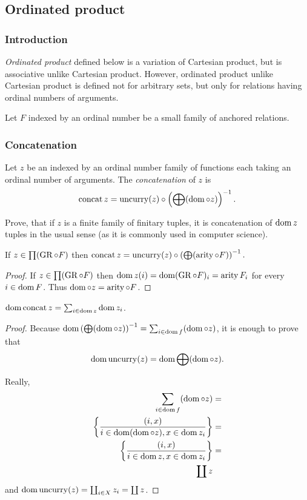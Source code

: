 \subsection{\label{ordinated-prod}Ordinated product}


\subsubsection{Introduction}

\emph{Ordinated product} defined below is a variation of Cartesian
product, but is associative unlike Cartesian product. However, ordinated
product unlike Cartesian product is defined not for arbitrary sets,
but only for relations having ordinal numbers of arguments.

Let $F$ indexed by an ordinal number be a small family of anchored
relations.


\subsubsection{Concatenation}
\begin{defn}
Let $z$ be an indexed by an ordinal number
family of functions each taking an ordinal number of arguments. The
\emph{concatenation} of $z$ is
\[
\operatorname{concat} z=\operatorname{uncurry}(z)\circ\left(\bigoplus(\operatorname{dom}\circ z)\right)^{-1}.
\]
\end{defn}
\begin{xca}
Prove, that if $z$ is a finite family of finitary tuples, it is concatenation
of $\operatorname{dom} z$ tuples in the usual sense (as it is commonly used in
computer science).\end{xca}
\begin{prop}
If $z\in\prod(\operatorname{GR}\circ F)$ then $\operatorname{concat} z=\operatorname{uncurry}(z)\circ\left(\bigoplus(\operatorname{arity}\circ F)\right)^{-1}.$\end{prop}
\begin{proof}
If $z\in\prod(\operatorname{GR}\circ F)$ then $\operatorname{dom} z(i)=\operatorname{dom}(\operatorname{GR}\circ F)_{i}=\operatorname{arity} F_{i}$
for every $i\in\operatorname{dom} F$. Thus $\operatorname{dom}\circ z=\operatorname{arity}\circ F$.\end{proof}
\begin{prop}
$\operatorname{dom}\operatorname{concat} z=\sum_{i\in\operatorname{dom} z}\operatorname{dom} z_{i}$.\end{prop}
\begin{proof}
Because $\operatorname{dom}\left(\bigoplus(\operatorname{dom}\circ z)\right)^{-1}=\sum_{i\in\operatorname{dom} f}(\operatorname{dom}\circ z)$,
it is enough to prove that
\[
\operatorname{dom}\operatorname{uncurry}(z)=\operatorname{dom}\bigoplus(\operatorname{dom}\circ z).
\]


Really,
\begin{align*}
\sum_{i\in\operatorname{dom} f}(\operatorname{dom}\circ z) & =\\
\left\{ \frac{(i,x)}{i\in\operatorname{dom}(\operatorname{dom}\circ z),x\in\operatorname{dom} z_{i}}\right\} & =\\
\left\{ \frac{(i,x)}{i\in\operatorname{dom} z,x\in\operatorname{dom} z_{i}}\right\} & =\\
\coprod z
\end{align*}
and $\operatorname{dom}\operatorname{uncurry}(z)=\coprod_{i\in X}z_{i}=\coprod z$.
\end{proof}

